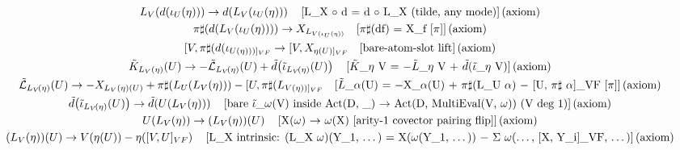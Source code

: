 \documentclass[11pt]{article}
\begin{document}
{\begin{gather*}
L_V\!\left(d\!\left(\iota_U\!\left(\eta\right)\right)\right) \to d\!\left(L_V\!\left(\iota_U\!\left(\eta\right)\right)\right) \quad \text{[L\_X \ensuremath{\circ} d = d \ensuremath{\circ} L\_X (tilde, any mode)]\,(axiom)} \\
\pi\sharp\!\left(d\!\left(L_V\!\left(\iota_U\!\left(\eta\right)\right)\right)\right) \to X_{L_{V(\iota_U(\eta))}} \quad \text{[\ensuremath{\pi}\ensuremath{\sharp}(df) = X\_f [\ensuremath{\pi}]]\,(axiom)} \\
[V,\pi\sharp(d(\iota_{U(\eta)))]_{VF}} \to [V,X_{\eta(U)]_{VF}} \quad \text{[bare-atom-slot lift]\,(axiom)} \\
\tilde{K}_{L_V(\eta)}\!\left(U\right) \to -\tilde{\mathcal{L}}_{L_V\!\left(\eta\right)}\!\left(U\right) + \tilde{d}\!\left(\tilde{\iota}_{L_V\!\left(\eta\right)}\!\left(U\right)\right) \quad \text{[\ensuremath{\tilde{K}}\_\ensuremath{\eta} V = \ensuremath{-}\ensuremath{\tilde{L}}\_\ensuremath{\eta} V + \ensuremath{\tilde{d}}(\ensuremath{\tilde{\ensuremath{\iota}}}\_\ensuremath{\eta} V)]\,(axiom)} \\
\tilde{\mathcal{L}}_{L_V\!\left(\eta\right)}\!\left(U\right) \to -X_{L_V(\eta)(U)} + \pi\sharp\!\left(L_U\!\left(L_V\!\left(\eta\right)\right)\right) - [U,\pi\sharp(L_{V(\eta))]_{VF}} \quad \text{[\ensuremath{\tilde{L}}\_\ensuremath{\alpha}(U) = \ensuremath{-}X\_{\ensuremath{\alpha}(U)} + \ensuremath{\pi}\ensuremath{\sharp}(L\_U \ensuremath{\alpha}) \ensuremath{-} [U, \ensuremath{\pi}\ensuremath{\sharp} \ensuremath{\alpha}]\_VF [\ensuremath{\pi}]]\,(axiom)} \\
\tilde{d}\!\left(\tilde{\iota}_{L_V\!\left(\eta\right)}\!\left(U\right)\right) \to \tilde{d}\!\left(U\!\left(L_V\!\left(\eta\right)\right)\right) \quad \text{[bare \ensuremath{\tilde{\ensuremath{\iota}}}\_\ensuremath{\omega}(V) inside Act(D, \_) \ensuremath{\to} Act(D, MultiEval(V, \ensuremath{\omega}))  (V deg 1)]\,(axiom)} \\
U\!\left(L_V\!\left(\eta\right)\right) \to \left(L_V\!\left(\eta\right)\right)\!\left(U\right) \quad \text{[X(\ensuremath{\omega}) \ensuremath{\to} \ensuremath{\omega}(X)  [arity-1 covector pairing flip]]\,(axiom)} \\
\left(L_V\!\left(\eta\right)\right)\!\left(U\right) \to V\!\left(\eta\!\left(U\right)\right) - \eta\!\left([V,U]_{VF}\right) \quad \text{[L\_X intrinsic: (L\_X \ensuremath{\omega})(Y\_1, \ensuremath{\dots}) = X(\ensuremath{\omega}(Y\_1, \ensuremath{\dots})) \ensuremath{-} \ensuremath{\Sigma} \ensuremath{\omega}(\ensuremath{\dots}, [X, Y\_i]\_VF, \ensuremath{\dots})]\,(axiom)} \\

\end{gather*}}
\end{document}
